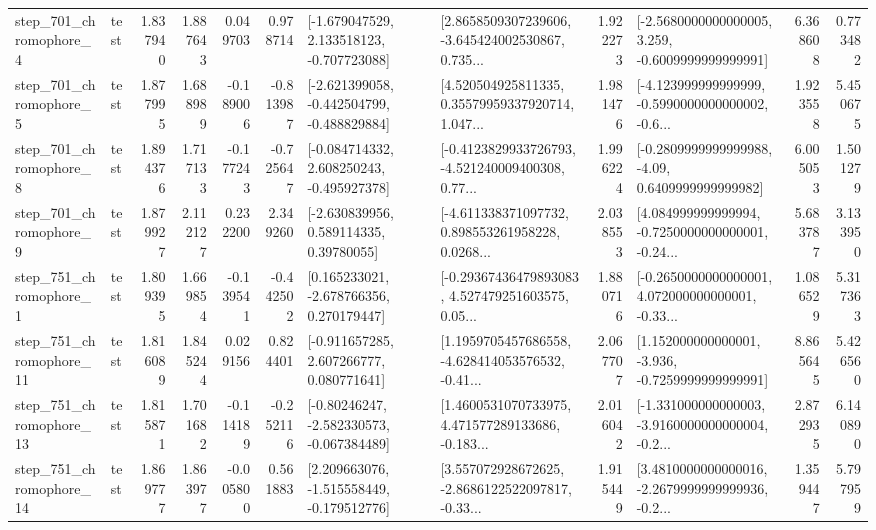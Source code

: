 \begin{tabular}{llrrrrllrlrr}
   step\_701\_chromophore\_4 &      test &      1.837940 &    1.887643 &      0.049703 &  0.978714 &   [-1.679047529, 2.133518123, -0.707723088] &  [2.8658509307239606, -3.645424002530867, 0.735... &       1.922273 &  [-2.5680000000000005, 3.259, -0.6009999999999991] &            6.368608 &          0.773482 \\
   step\_701\_chromophore\_5 &      test &      1.877995 &    1.688989 &     -0.189006 & -0.813987 &  [-2.621399058, -0.442504799, -0.488829884] &  [4.520504925811335, 0.35579959337920714, 1.047... &       1.981476 &  [-4.123999999999999, -0.5990000000000002, -0.6... &            1.923558 &          5.450675 \\
   step\_701\_chromophore\_8 &      test &      1.894376 &    1.717133 &     -0.177243 & -0.725647 &   [-0.084714332, 2.608250243, -0.495927378] &  [-0.4123829933726793, -4.521240009400308, 0.77... &       1.996224 &   [-0.2809999999999988, -4.09, 0.6409999999999982] &            6.005053 &          1.501279 \\
   step\_701\_chromophore\_9 &      test &      1.879927 &    2.112127 &      0.232200 &  2.349260 &     [-2.630839956, 0.589114335, 0.39780055] &  [-4.611338371097732, 0.898553261958228, 0.0268... &       2.038553 &  [4.084999999999994, -0.7250000000000001, -0.24... &            5.683787 &          3.133950 \\
   step\_751\_chromophore\_1 &      test &      1.809395 &    1.669854 &     -0.139541 & -0.442502 &    [0.165233021, -2.678766356, 0.270179447] &  [-0.29367436479893083, 4.527479251603575, 0.05... &       1.880716 &  [-0.2650000000000001, 4.072000000000001, -0.33... &            1.086529 &          5.317363 \\
  step\_751\_chromophore\_11 &      test &      1.816089 &    1.845244 &      0.029156 &  0.824401 &    [-0.911657285, 2.607266777, 0.080771641] &  [1.1959705457686558, -4.628414053576532, -0.41... &       2.067707 &   [1.152000000000001, -3.936, -0.7259999999999991] &            8.865645 &          5.426560 \\
  step\_751\_chromophore\_13 &      test &      1.815871 &    1.701682 &     -0.114189 & -0.252116 &   [-0.80246247, -2.582330573, -0.067384489] &  [1.4600531070733975, 4.471577289133686, -0.183... &       2.016042 &  [-1.331000000000003, -3.9160000000000004, -0.2... &            2.872935 &          6.140890 \\
  step\_751\_chromophore\_14 &      test &      1.869777 &    1.863977 &     -0.005800 &  0.561883 &   [2.209663076, -1.515558449, -0.179512776] &  [3.557072928672625, -2.8686122522097817, -0.33... &       1.915449 &  [3.4810000000000016, -2.2679999999999936, -0.2... &            1.359447 &          5.797959 \\

\end{tabular}
